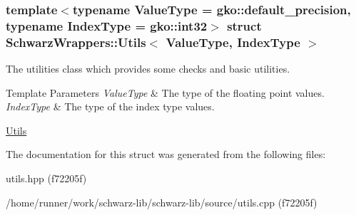 \subsubsection*{template$<$typename Value\+Type = gko\+::default\+\_\+precision, typename Index\+Type = gko\+::int32$>$\newline
struct Schwarz\+Wrappers\+::\+Utils$<$ Value\+Type, Index\+Type $>$}

The utilities class which provides some checks and basic utilities. 


\begin{DoxyTemplParams}{Template Parameters}
{\em Value\+Type} & The type of the floating point values. \\
\hline
{\em Index\+Type} & The type of the index type values.\\
\hline
\end{DoxyTemplParams}
\hyperlink{group__utils}{Utils} 

The documentation for this struct was generated from the following files\+:\begin{DoxyCompactItemize}
\item 
utils.\+hpp (f72205f)\item 
/home/runner/work/schwarz-\/lib/schwarz-\/lib/source/utils.\+cpp (f72205f)\end{DoxyCompactItemize}
